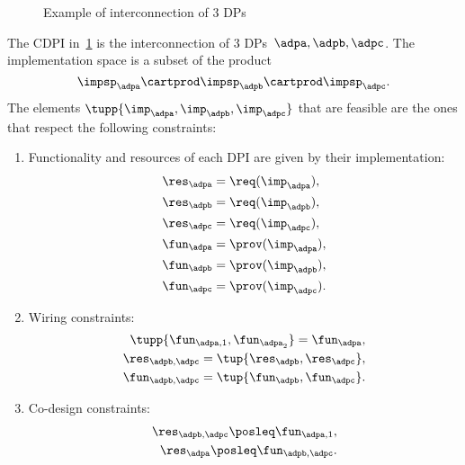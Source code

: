 \begin{figure}
    \centering
    \caption{Example of interconnection of 3 DPs}
    \label{fig:exampleq}
\end{figure}
\begin{example}
    The CDPI in~\cref{fig:exampleq} is the interconnection of 3 DPs~$\adpa,\adpb,\adpc$.
    The implementation space is a subset of the product
    \begin{equation}
        \impsp_\adpa \cartprod  \impsp_\adpb \cartprod \impsp_\adpc.
    \end{equation}
    The elements $\tupp{\imp_\adpa, \imp_\adpb, \imp_\adpc}$ that are feasible are the ones that respect the following constraints:
    \begin{enumerate}
        \item Functionality and resources of each DPI are given by their implementation:
              \begin{align}
                  \res_\adpa & = \req(\imp_\adpa), \\
                  \res_\adpb & = \req(\imp_\adpb), \\
                  \res_\adpc & = \req(\imp_\adpc), \\
                  \fun_\adpa & = \prov(\imp_\adpa), \\
                  \fun_\adpb & = \prov(\imp_\adpb), \\
                  \fun_\adpc & = \prov(\imp_\adpc).
              \end{align}
        \item Wiring constraints:
              \begin{align}
                  \tupp{\fun_{\adpa,1}, \fun_{\adpa_2}}  = \fun_\adpa, \\
                  \res_{\adpb,\adpc}=\tup{\res_\adpb,\res_\adpc}, \\
                  \fun_{\adpb,\adpc}=\tup{\fun_\adpb,\fun_\adpc}.
              \end{align}
        \item Co-design constraints:
              \begin{align}
                  \res_{\adpb,\adpc}\posleq \fun_{\adpa,1}, \\
                  \res_\adpa \posleq \fun_{\adpb,\adpc}.
              \end{align}
    \end{enumerate}
\end{example}

